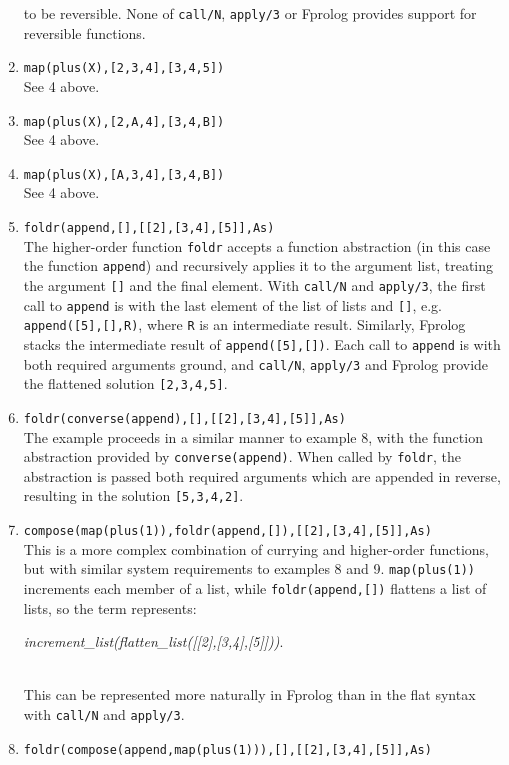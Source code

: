 \documentclass[a4paper,11pt,twoside]{article}
\begin{document}
\begin{enumerate}
{  to be reversible.  None of \texttt{call/N}, \texttt{apply/3} or Fprolog
  provides support for reversible functions.}
\item{\texttt{map(plus(X),[2,3,4],[3,4,5])}\\
  See 4 above.}
\item{\texttt{map(plus(X),[2,A,4],[3,4,B])}\\
  See 4 above.}
\item{\texttt{map(plus(X),[A,3,4],[3,4,B])}\\
  See 4 above.}
\item{\texttt{foldr(append,[],[[2],[3,4],[5]],As)}\\
  The higher-order function \texttt{foldr} accepts a function abstraction
  (in this case the function \texttt{append}) and recursively applies it to
  the argument list, treating the argument \texttt{[]} and the final element.
  With \texttt{call/N} and \texttt{apply/3},
  the first call to \texttt{append} is with the last element of the list of lists 
  and \texttt{[]}, e.g. \texttt{append([5],[],R)}, where \texttt{R} is an intermediate
  result. Similarly, Fprolog stacks the intermediate result of
  \texttt{append([5],[])}.  Each call to \texttt{append} is with both required
  arguments ground, and \texttt{call/N}, \texttt{apply/3} and Fprolog provide the
  flattened solution \mbox{\texttt{[2,3,4,5]}}.}
\item{\texttt{foldr(converse(append),[],[[2],[3,4],[5]],As)}\\
  The example proceeds in a similar manner to example 8, with the function
  abstraction provided by \texttt{converse(append)}.  When called by
  \texttt{foldr}, the abstraction is passed both required arguments which are
  appended in reverse, resulting in the solution \texttt{[5,3,4,2]}.}
\item{\texttt{compose(map(plus(1)),foldr(append,[]),[[2],[3,4],[5]],As)}\\
  This is a more complex combination of currying and higher-order
  functions, but with similar system requirements to examples 8 and 9.
  \texttt{map(plus(1))} increments each member of a list, while 
  \texttt{foldr(append,[])} flattens a list of lists, so the term represents:\\
  \centerline{\mbox{\textit{increment\_{}list(flatten\_{}list([[2],[3,4],[5]]))}}.}\\
  This can be represented
  more naturally in Fprolog than in the flat syntax with \texttt{call/N} and
  \texttt{apply/3}.}
\item{\texttt{foldr(compose(append,map(plus(1))),[],[[2],[3,4],[5]],As)}\\
}
\end{enumerate}
\end{document}
